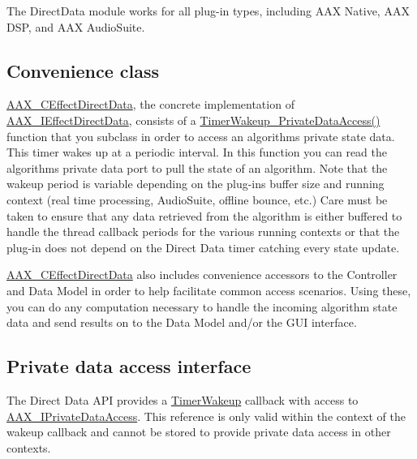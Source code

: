 The Direct\+Data module works for all plug-\/in types, including A\+A\+X Native, A\+A\+X D\+S\+P, and A\+A\+X Audio\+Suite.\hypertarget{a00333_auxinterface_directdata_convenienceclass}{}\subsection{Convenience class}\label{a00333_auxinterface_directdata_convenienceclass}
\hyperlink{a00016}{A\+A\+X\+\_\+\+C\+Effect\+Direct\+Data}, the concrete implementation of \hyperlink{a00097}{A\+A\+X\+\_\+\+I\+Effect\+Direct\+Data}, consists of a \hyperlink{a00016_addd263d3a410d5c26148cee306cc7297}{Timer\+Wakeup\+\_\+\+Private\+Data\+Access()} function that you subclass in order to access an algorithm\textquotesingle{}s private state data. This timer wakes up at a periodic interval. In this function you can read the algorithm\textquotesingle{}s private data port to pull the state of an algorithm. Note that the wakeup period is variable depending on the plug-\/in\textquotesingle{}s buffer size and running context (real time processing, Audio\+Suite, offline bounce, etc.) Care must be taken to ensure that any data retrieved from the algorithm is either buffered to handle the thread callback periods for the various running contexts or that the plug-\/in does not depend on the Direct Data timer catching every state update.

\hyperlink{a00016}{A\+A\+X\+\_\+\+C\+Effect\+Direct\+Data} also includes convenience accessors to the Controller and Data Model in order to help facilitate common access scenarios. Using these, you can do any computation necessary to handle the incoming algorithm state data and send results on to the Data Model and/or the G\+U\+I interface.\hypertarget{a00333_auxinterface_directdata_privatedataaccess}{}\subsection{Private data access interface}\label{a00333_auxinterface_directdata_privatedataaccess}
The Direct Data A\+P\+I provides a \hyperlink{a00059_afb4fa2c566547d7bd303166cf50741bb}{Timer\+Wakeup} callback with access to \hyperlink{a00111}{A\+A\+X\+\_\+\+I\+Private\+Data\+Access}. This reference is only valid within the context of the wakeup callback and cannot be stored to provide private data access in other contexts.

